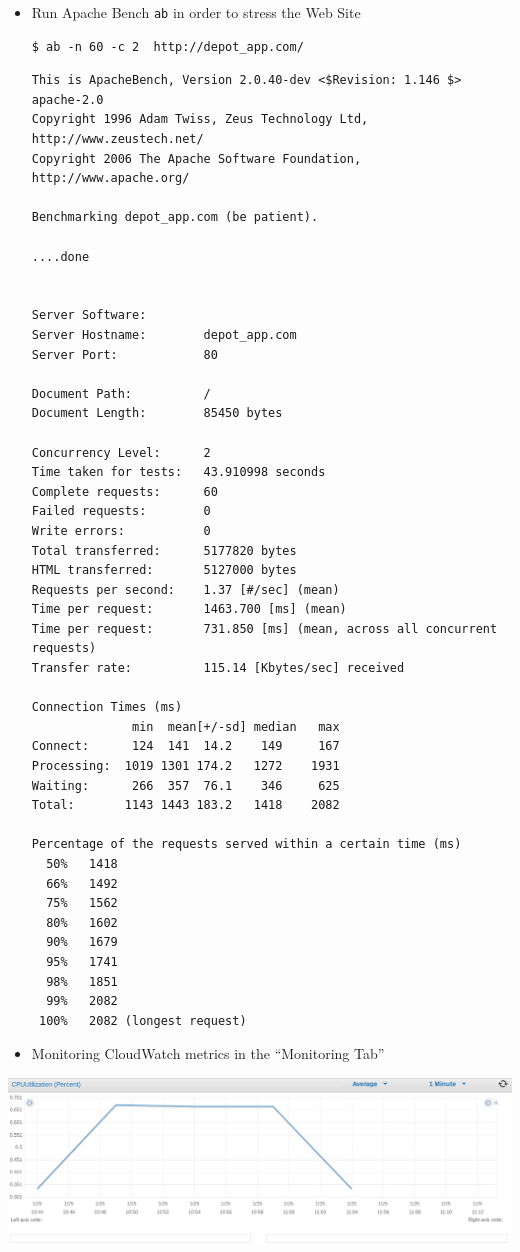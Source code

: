 \documentclass{beamer}
\begin{document}
\begin{frame}
\begin{itemize}
\item Run Apache Bench \texttt{ab} in order to stress the Web Site

\lstset{language=shell}
\begin{lstlisting}[escapechar=!]
$ ab -n 60 -c 2  http://depot_app.com/
\end{lstlisting}


\lstset{language=shell}
\begin{lstlisting}[escapechar=!]
This is ApacheBench, Version 2.0.40-dev <$Revision: 1.146 $> apache-2.0
Copyright 1996 Adam Twiss, Zeus Technology Ltd, http://www.zeustech.net/
Copyright 2006 The Apache Software Foundation, http://www.apache.org/

Benchmarking depot_app.com (be patient).
   
....done


Server Software:
Server Hostname:        depot_app.com
Server Port:            80

Document Path:          /
Document Length:        85450 bytes

Concurrency Level:      2
Time taken for tests:   43.910998 seconds
Complete requests:      60
Failed requests:        0
Write errors:           0
Total transferred:      5177820 bytes
HTML transferred:       5127000 bytes
Requests per second:    1.37 [#/sec] (mean)
Time per request:       1463.700 [ms] (mean)
Time per request:       731.850 [ms] (mean, across all concurrent requests)
Transfer rate:          115.14 [Kbytes/sec] received

Connection Times (ms)
              min  mean[+/-sd] median   max
Connect:      124  141  14.2    149     167
Processing:  1019 1301 174.2   1272    1931
Waiting:      266  357  76.1    346     625
Total:       1143 1443 183.2   1418    2082

Percentage of the requests served within a certain time (ms)
  50%   1418
  66%   1492
  75%   1562
  80%   1602
  90%   1679
  95%   1741
  98%   1851
  99%   2082
 100%   2082 (longest request)

\end{lstlisting}

\item Monitoring CloudWatch metrics in the ``Monitoring Tab''

\end{itemize}
\begin{center}
\includegraphics[width=0.75 \textwidth]{cpuutilization.png}
\end{center}
\end{frame}
\end{document}
